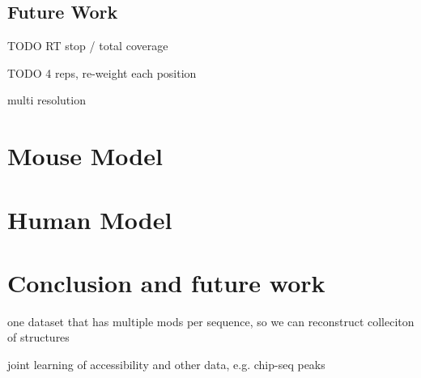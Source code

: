 \documentclass{proposal}
\begin{document}
\section{Future Work}

TODO RT stop / total coverage

TODO 4 reps, re-weight each position

multi resolution

\chapter{Mouse Model}


\chapter{Human Model}

\chapter{Conclusion and future work}

one dataset that has multiple mods per sequence, so we can reconstruct colleciton of structures

joint learning of accessibility and other data, e.g. chip-seq peaks




\end{document}
